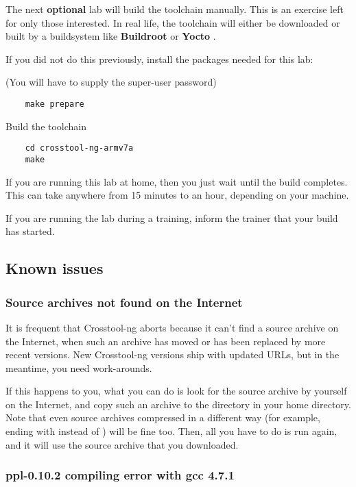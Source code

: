 The next {\bf optional } lab will build the toolchain manually. 
This is an exercise left for only those interested. 
In real life, the toolchain will either be downloaded or built by a
buildsystem like {\bf Buildroot } or {\bf Yocto }.

If you did not do this previously, install the packages needed for this lab:

(You will have to supply the super-user password)

\begin{verbatim}
	make prepare
\end{verbatim}

Build the toolchain

\begin{verbatim}
	cd crosstool-ng-armv7a
	make
\end{verbatim}

If you are running this lab at home, then you just wait until the build completes.
This can take anywhere from 15 minutes to an hour, depending on your machine.

If you are running the lab during a training, inform the trainer that your build has started.
\clearpage
\subsection{Known issues}

\subsubsection{Source archives not found on the Internet}

It is frequent that Crosstool-ng aborts because it can't find a
source archive on the Internet, when such an archive has moved or has
been replaced by more recent versions. New Crosstool-ng versions ship
with updated URLs, but in the meantime, you need work-arounds.

If this happens to you, what you can do is look for the source archive by
yourself on the Internet, and copy such an archive to the 
directory in your home directory. Note that even source archives
compressed in a different way (for example, ending with 
instead of ) will be fine too. Then, all you have to do is run
 again, and it will use the source archive that you
downloaded.

\subsubsection{ppl-0.10.2 compiling error with gcc 4.7.1}

